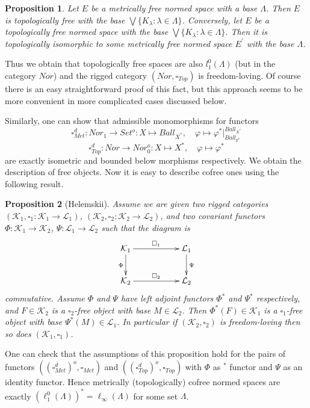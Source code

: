 \documentclass[a0b,landscape]{a0poster}
\newtheorem*{proposition}{Proposition}
\begin{document}
\begin{multicols}{4}
\begin{proposition} Let $E$ be a metrically free normed space with a base
$\Lambda$. Then $E$ is topologically free with the base $\bigvee \{K_{\lambda} :
\lambda \in\Lambda \}$. Conversely, let $E$ be a topologically free normed space
with the base $\bigvee \{K_{\lambda}: \lambda \in\Lambda \}$. Then it is
topologically isomorphic to some metrically free normed space $E^{'}$ with the
base $\Lambda$.
\end{proposition}

Thus we obtain that topologically free spaces are also $l_1^0(\Lambda)$ (but in
the category $Nor$) and the rigged category $(Nor, \square_{Top})$ is
freedom-loving. Of course there is an easy straightforward proof of this fact,
but this approach seems to be more convenient in more complicated cases
discussed below.

Similarly, one can show that admissible monomorphisms for functors
$$
\square_{Met}^d
:Nor_1\to Set^o
: X\mapsto Ball_{X^*},\quad\varphi\mapsto \varphi^*|_{Ball_{Y^*}}^{Ball_{X^*}}
$$
$$
\square_{Top}^d:Nor\to Nor_0^o: X\mapsto X^*,\quad\varphi\mapsto \varphi^*
$$
are exactly isometric and bounded below morphisms respectively. We obtain the
description of free objects. Now it is easy to describe cofree ones using the
following result.

\begin{proposition}[Helemskii] Assume we are given two rigged categories
$(\mathcal{K}_1, \square_1: \mathcal{K}_1 \to \mathcal{L}_1)$, $(\mathcal{K}_2,
\square_2 : \mathcal{K}_2 \to \mathcal{L}_2)$, and two covariant functors $\Phi
: \mathcal{K}_1 \to \mathcal{K}_2$, $\Psi : \mathcal{L}_1 \to \mathcal{L}_2$
such that the diagram is
$$
\xymatrix{
{\mathcal{K}_1}\ar[d]_{\Phi}  %
\ar[rr]^{\square_1} && {\mathcal{L}_1}\ar[d]^{\Psi}\\  %
{\mathcal{K}_2}\ar[rr]^{\square_2} &&{\mathcal{L}_2}}  %
$$
commutative. Assume $\Phi$ and $\Psi$ have left adjoint functors $\Phi^*$ and
$\Psi^*$ respectively, and $F\in\mathcal{K}_2$ is a $\square_2$-free object with
base $M\in\mathcal{L}_2$. Then $\Phi^*(F)\in\mathcal{K}_1$ is a $\square_1$-free
object with base $\Psi^*(M)\in\mathcal{L}_1$. In particular if
$(\mathcal{K}_2,\square_2)$ is freedom-loving then so does
$(\mathcal{K}_1,\square_1)$.
\end{proposition}

One can check that the assumptions of this proposition hold for the pairs of
functors $({(\square_{Met}^d)}^o,\square_{Met})$ and
$({(\square_{Top}^d)}^o,\square_{Top})$ with $\Phi$ as ${}^*$ functor and $\Psi$
as an identity functor. Hence metrically (topologically) cofree normed spaces
are exactly ${(\ell_1^0(\Lambda))}^*=\ell_\infty(\Lambda)$ for some 
set $\Lambda$.


\end{multicols}
\end{document}
